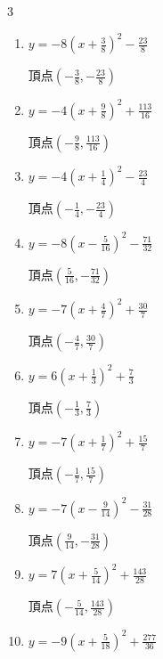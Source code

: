 \begin{multicols}{3}
\begin{enumerate}
        $\displaystyle 頂点\left( -\frac{7}{6} , -\frac{73}{12} \right)$

  \item $\displaystyle y=-8\left( x+\frac{3}{8}\right)^{2}-\frac{23}{8}$

        $\displaystyle 頂点\left( -\frac{3}{8} , -\frac{23}{8} \right)$

  \item $\displaystyle y=-4\left( x+\frac{9}{8}\right)^{2}+\frac{113}{16}$

        $\displaystyle 頂点\left( -\frac{9}{8} , \frac{113}{16} \right)$

\columnbreak %

  \item $\displaystyle y=-4\left( x+\frac{1}{4}\right)^{2}-\frac{23}{4}$

        $\displaystyle 頂点\left( -\frac{1}{4} , -\frac{23}{4} \right)$

  \item $\displaystyle y=-8\left( x-\frac{5}{16}\right)^{2}-\frac{71}{32}$

        $\displaystyle 頂点\left( \frac{5}{16} , -\frac{71}{32} \right)$

  \item $\displaystyle y=-7\left( x+\frac{4}{7}\right)^{2}+\frac{30}{7}$

        $\displaystyle 頂点\left( -\frac{4}{7} , \frac{30}{7} \right)$

  \item $\displaystyle y=6\left( x+\frac{1}{3}\right)^{2}+\frac{7}{3}$

        $\displaystyle 頂点\left( -\frac{1}{3} , \frac{7}{3} \right)$

  \item $\displaystyle y=-7\left( x+\frac{1}{7}\right)^{2}+\frac{15}{7}$

        $\displaystyle 頂点\left( -\frac{1}{7} , \frac{15}{7} \right)$

  \item $\displaystyle y=-7\left( x-\frac{9}{14}\right)^{2}-\frac{31}{28}$

        $\displaystyle 頂点\left( \frac{9}{14} , -\frac{31}{28} \right)$

  \item $\displaystyle y=7\left( x+\frac{5}{14}\right)^{2}+\frac{143}{28}$

        $\displaystyle 頂点\left( -\frac{5}{14} , \frac{143}{28} \right)$

  \item $\displaystyle y=-9\left( x+\frac{5}{18}\right)^{2}+\frac{277}{36}$


\end{enumerate}
\end{multicols}
